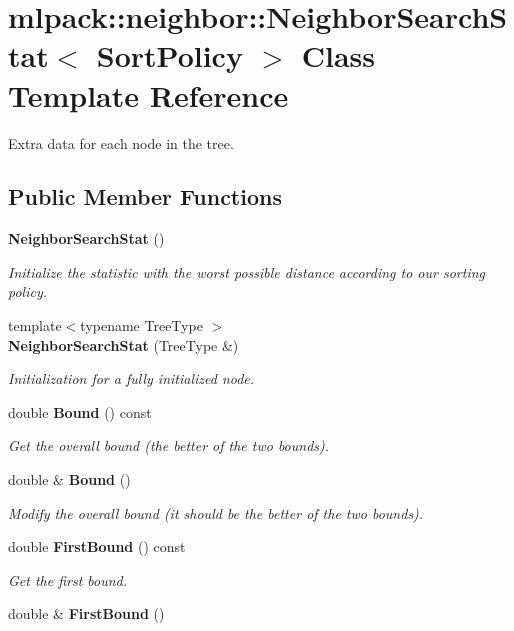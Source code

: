 \section{mlpack\-:\-:neighbor\-:\-:Neighbor\-Search\-Stat$<$ Sort\-Policy $>$ Class Template Reference}
\label{classmlpack_1_1neighbor_1_1NeighborSearchStat}


Extra data for each node in the tree.  


\subsection*{Public Member Functions}
\begin{DoxyCompactItemize}
\item 
{\bf Neighbor\-Search\-Stat} ()
\begin{DoxyCompactList}\small\item\em Initialize the statistic with the worst possible distance according to our sorting policy. \end{DoxyCompactList}\item 
{\footnotesize template$<$typename Tree\-Type $>$ }\\{\bf Neighbor\-Search\-Stat} (Tree\-Type \&)
\begin{DoxyCompactList}\small\item\em Initialization for a fully initialized node. \end{DoxyCompactList}\item 
double {\bf Bound} () const 
\begin{DoxyCompactList}\small\item\em Get the overall bound (the better of the two bounds). \end{DoxyCompactList}\item 
double \& {\bf Bound} ()
\begin{DoxyCompactList}\small\item\em Modify the overall bound (it should be the better of the two bounds). \end{DoxyCompactList}\item 
double {\bf First\-Bound} () const 
\begin{DoxyCompactList}\small\item\em Get the first bound. \end{DoxyCompactList}\item 
double \& {\bf First\-Bound} ()

\end{DoxyCompactItemize}

